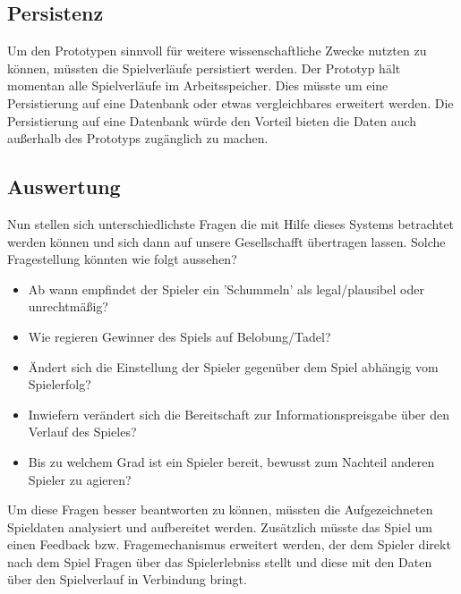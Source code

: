 \documentclass[german]{cgspaper} %
\begin{document}
\subsection{Persistenz}

Um den Prototypen sinnvoll für weitere wissenschaftliche Zwecke nutzten zu können, müssten die Spielverläufe persistiert werden.
Der Prototyp hält momentan alle Spielverläufe im Arbeitsspeicher.
Dies müsste um eine Persistierung auf eine Datenbank oder etwas vergleichbares erweitert werden.
Die Persistierung auf eine Datenbank würde den Vorteil bieten die Daten auch außerhalb des Prototyps zugänglich zu machen.

\subsection{Auswertung}

Nun stellen sich unterschiedlichste Fragen die mit Hilfe dieses Systems betrachtet werden können und sich dann auf unsere Gesellschafft übertragen lassen.
Solche Fragestellung könnten wie folgt aussehen?

\begin{itemize}
\item Ab wann empfindet der Spieler ein 'Schummeln' als legal/plausibel oder unrechtmäßig?
\item Wie regieren Gewinner des Spiels auf Belobung/Tadel?
\item Ändert sich die Einstellung der Spieler gegenüber dem Spiel abhängig vom Spielerfolg?
\item Inwiefern verändert sich die Bereitschaft zur Informationspreisgabe über den Verlauf des Spieles?
\item Bis zu welchem Grad ist ein Spieler bereit, bewusst zum Nachteil anderen Spieler zu agieren?
\end{itemize}

Um diese Fragen besser beantworten zu können, müssten die Aufgezeichneten Spieldaten analysiert und aufbereitet werden.
Zusätzlich müsste das Spiel um einen Feedback bzw. Fragemechanismus erweitert werden, der dem Spieler direkt nach dem Spiel Fragen über das Spielerlebniss stellt und diese mit den Daten über den Spielverlauf in Verbindung bringt.



\end{document}
